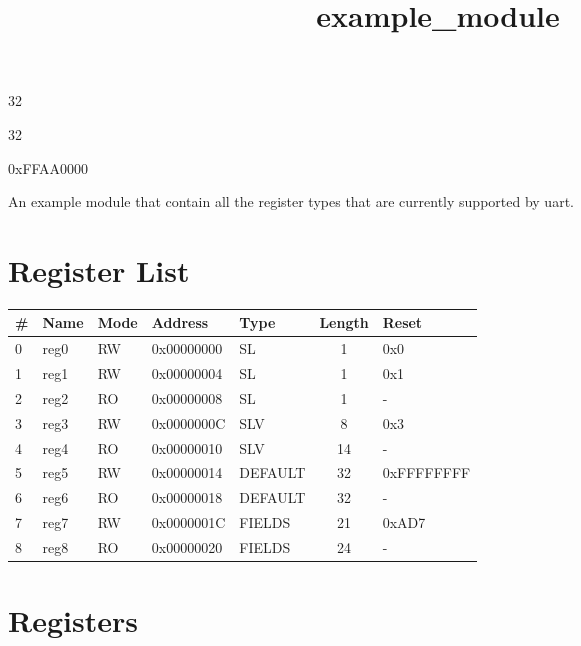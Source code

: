 \documentclass{article}
\title{example\_module}
\author{}
\date{}
\begin{document}
\maketitle

\begin{description}[leftmargin=!,labelwidth=\widthof{\bfseries Address width: }]
\item [Address width: ] 32
\item [Data width: ] 32
\item [Base address: ] 0xFFAA0000
\end{description}


An example module that contain all the register types that are currently supported by uart.

\section{Register List}

\begin{table}[h!]
  \begin{center}
    \label{tab:table1}
    \begin{tabularx}{\linewidth}{|l|X|l|l|l|c|l|}
      \hline
      \textbf{\#} & \textbf{Name} & \textbf{Mode} & \textbf{Address} & \textbf{Type} & \textbf{Length} &
      \textbf{Reset} \\
      \hline
      0 & reg0 & RW & 0x00000000 & SL & 1 & 0x0 \\
      \hline
      1 & reg1 & RW & 0x00000004 & SL & 1 & 0x1 \\
      \hline
      2 & reg2 & RO & 0x00000008 & SL & 1 & - \\
      \hline
      3 & reg3 & RW & 0x0000000C & SLV & 8 & 0x3 \\
      \hline
      4 & reg4 & RO & 0x00000010 & SLV & 14 & - \\
      \hline
      5 & reg5 & RW & 0x00000014 & DEFAULT & 32 & 0xFFFFFFFF \\
      \hline
      6 & reg6 & RO & 0x00000018 & DEFAULT & 32 & - \\
      \hline
      7 & reg7 & RW & 0x0000001C & FIELDS & 21 & 0xAD7 \\
      \hline
      8 & reg8 & RO & 0x00000020 & FIELDS & 24 & - \\
      \hline
    \end{tabularx}
  \end{center}
\end{table}


\section{Registers}
\end{document}
